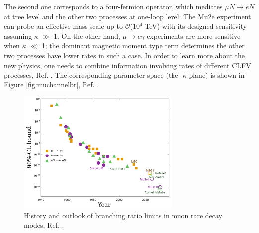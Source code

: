 The second one corresponds to a four-fermion operator, which mediates $\mu N \rightarrow eN$ at tree level and the other two processes at one-loop level.
The Mu2e experiment can probe an effective mass scale up to $\mathcal{O}$(10$^4$ TeV) with its designed sensitivity assuming $\kappa$ $\gg$ 1.
On the other hand, $\mu \rightarrow e\gamma$ experiments are more sensitive when $\kappa$ $\ll$ 1; the dominant magnetic
moment type term determines the other two processes have lower rates in such a case. In order to learn more about the new
physics, one needs to combine information involving  rates of  different CLFV processes, Ref. \cite{osti_1042577}.
The corresponding parameter space (the \del{$\Gamma$}\add{$\Lambda$}-$\kappa$ plane) is shown in 
Figure \ref{fig:muchannelbr}, Ref. \cite{doi:10.1146/annurev-nucl-100809-131949}.
\begin{figure}[!h]
\centering
\includegraphics[width =0.7\textwidth]{figures/png/Screenshot_20240307_161549.png}
\caption[Branching ratio limits in muon rare decay modes.]{History and outlook of branching ratio limits in muon rare decay modes, Ref. \cite{MARCIANO1977303}.}
\label{fig:muchannel}
\end{figure}
